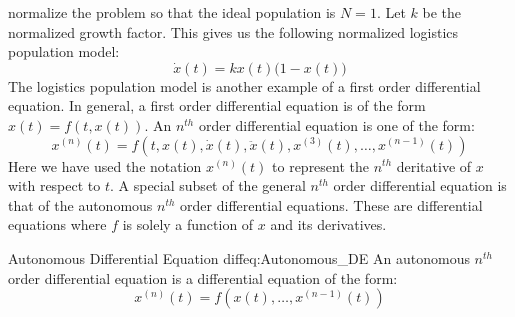                 normalize the problem so that the ideal population
                is $N=1$. Let $k$ be the normalized growth factor.
                This gives us the following normalized
                logistics population model:
                \begin{equation}
                    \label{diffeq:Normalized_Log_Pop_Model_DE}
                    \dot{x}(t)=kx(t)\big(1-x(t)\big)
                \end{equation}
                The logistics population model is another example
                of a first order differential equation. In general,
                a first order differential equation is of the form
                $x(t)=f(t,x(t))$. An $n^{th}$ order differential
                equation is one of the form:
                \begin{equation*}
                    x^{(n)}(t)
                    =f(t,x(t),\dot{x}(t),\ddot{x}(t),
                       x^{(3)}(t),\hdots,x^{(n-1)}(t))
                \end{equation*}
                Here we have used the notation
                $x^{(n)}(t)$ to represent the $n^{th}$ deritative
                of $x$ with respect to $t$. A special subset of the
                general $n^{th}$ order differential equation is that
                of the autonomous $n^{th}$ order differential
                equations. These are differential equations where
                $f$ is solely a function of $x$ and its derivatives.
                \begin{fdefinition}{Autonomous Differential Equation}
                    {diffeq:Autonomous_DE}
                    An autonomous $n^{th}$ order differential
                    equation is a differential equation of the
                    form:
                    \begin{equation}
                        x^{(n)}(t)=f(x(t),\hdots,x^{(n-1)}(t))
                    \end{equation}
                \end{fdefinition}
